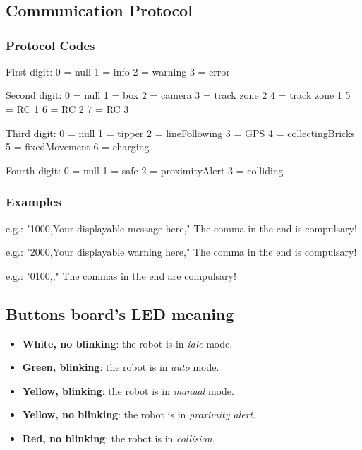 \chapter{}

\section{Communication Protocol}\label{"apx:com_prot"}

	\subsection{Protocol Codes}

	First digit:
	0 = null
	1 = info
	2 = warning
	3 = error

	Second digit:
	0 = null
	1 = box
	2 = camera 
	3 = track zone 2
	4 = track zone 1
	5 = RC 1
	6 = RC 2
	7 = RC 3

	Third digit:
	0 = null
	1 = tipper
	2 = lineFollowing 
	3 = GPS 
	4 = collectingBricks
	5 = fixedMovement
	6 = charging

	Fourth digit:
	0 = null
	1 = safe
	2 = proximityAlert
	3 = colliding

	\subsection{Examples}

	e.g.: "1000,Your displayable message here,"  The comma in the end is compulsary!

	e.g.: "2000,Your displayable warning here,"  The comma in the end is compulsary!

	e.g.: "0100,,"  The commas in the end are compulsary!



\section{Buttons board's LED meaning} %
\label{sec:buttons_board_s_led_meaning}

\begin{itemize}
	\item \textbf{White, no blinking}: the robot is in \emph{idle} mode.
	\item \textbf{Green, blinking}: the robot is in \emph{auto} mode.
	\item \textbf{Yellow, blinking}: the robot is in \emph{manual} mode.
	\item \textbf{Yellow, no blinking}: the robot is in \emph{proximity alert}.
	\item \textbf{Red, no blinking}: the robot is in \emph{collision}.
\end{itemize}

